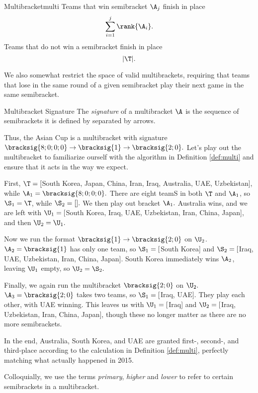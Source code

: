 {\begin{definition}{Multibracket}{multi}
        Teams that win semibracket $\A_j$ finish in place $$\sum_{i=1}^{j} \rank{\A_i}.$$
        Teams that do not win a semibracket finish in place $$|\T|.$$

        We also somewhat restrict the space of valid multibrackets, requiring that teams that lose in the same round of a given semibracket play their next game in the same semibracket.
    \end{definition}

    \begin{definition}{Multibracket Signature}{}
        The \textit{signature} of a multibracket $\A$ is the sequence of semibrackets it is defined by separated by arrows.
    \end{definition}

    Thus, the Asian Cup is a multibracket with signature $\bracksig{8;0;0;0} \to \bracksig{1} \to \bracksig{2;0}.$ Let's play out the multibracket to familiarize ourself with the algorithm in Definition \ref{def:multi} and ensure that it acts in the way we expect.

    First, $\T = [$South Korea, Japan, China, Iran, Iraq, Australia, UAE, Uzbekistan], while $\A_1 = \bracksig{8;0;0;0}.$ There are eight teamS in both $\T$ and $\A_1$, so $\S_1 = \T$, while $\S_2 = [].$ We then play out bracket $\A_1.$ Australia wins, and we are left with $\U_1 = [$South Korea, Iraq, UAE, Uzbekistan, Iran, China, Japan], and then $\U_2 = \U_1.$

    Now we run the format $\bracksig{1} \to \bracksig{2;0}$ on $\U_2$. $\A_2 = \bracksig{1}$ has only one team, so $\S_1 =[$South Korea] and $\S_2 =[$Iraq, UAE, Uzbekistan, Iran, China, Japan]. South Korea immediately wins $\A_2$, leaving $\U_1$ empty, so $\U_2 = \S_2.$

    Finally, we again run the multibracket $\bracksig{2;0}$ on $\U_2.$ $\A_3 = \bracksig{2;0}$ takes two teams, so $\S_1 =[$Iraq, UAE]. They play each other, with UAE winning. This leaves us with $\U_1 = [$Iraq] and $\U_2 = [$Iraq, Uzbekistan, Iran, China, Japan], though these no longer matter as there are no more semibrackets.

    In the end, Australia, South Korea, and UAE are granted first-, second-, and third-place according to the calculation in Definition \ref{def:multi}, perfectly matching what actually happened in 2015.

    Colloquially, we use the terms \textit{primary}, \textit{higher} and \textit{lower} to refer to certain semibrackets in a multibracket.

}
